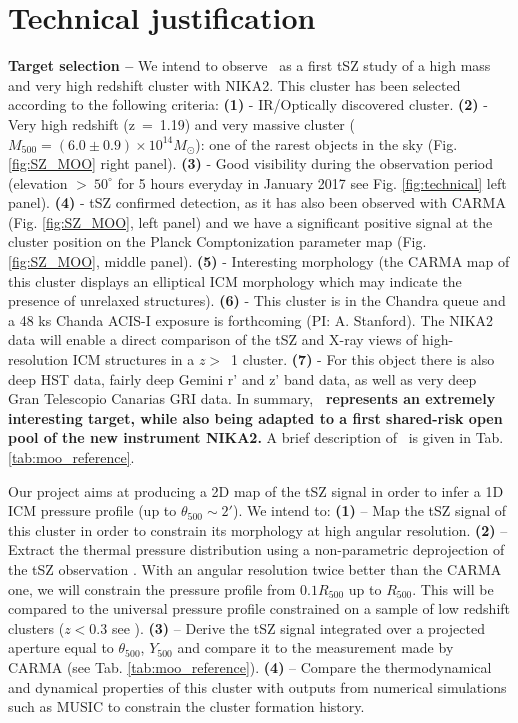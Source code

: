 \documentclass[11pt,a4paper,twoside,graphicx,color]{article}
\begin{document}
\section{Technical justification}
{\bf \large Target selection -- }
We intend to observe \moo\ as a first tSZ study of a high mass and very high redshift cluster with NIKA2. This cluster has been selected according to the following criteria: \textbf{(1)} - IR/Optically discovered cluster. \textbf{(2)} - Very high redshift (z~=~1.19) and very massive cluster ($M_{500} = (6.0 \pm 0.9) \times 10^{14} M_{\odot}$): one of the rarest objects in the sky (Fig. \ref{fig:SZ_MOO} right panel). \textbf{(3)} - Good visibility during the observation period (elevation $>~50^\circ$ for 5 hours everyday in January 2017 see Fig. \ref{fig:technical} left panel). \textbf{(4)} - tSZ confirmed detection, as it has also been observed with CARMA (Fig. \ref{fig:SZ_MOO}, left panel) and we have a significant positive signal at the cluster position on the Planck Comptonization parameter map (Fig. \ref{fig:SZ_MOO}, middle panel). \textbf{(5)} - Interesting morphology (the CARMA map of this cluster displays an elliptical ICM morphology which may indicate the presence of unrelaxed structures). \textbf{(6)} - This cluster is in the Chandra queue and a 48 ks Chanda ACIS-I exposure is forthcoming (PI: A. Stanford).  The NIKA2 data will enable a direct comparison of the tSZ and X-ray views of high-resolution ICM structures in a $z >$~1 cluster. \textbf{(7)} - For this object there is also deep HST data, fairly deep Gemini r' and z' band data, as well as very deep Gran Telescopio Canarias GRI data.
In summary, \textbf{\moo\ represents an extremely interesting target, while also being adapted to a first shared-risk open pool of the new instrument NIKA2.} A brief description of \moo\ is given in Tab. \ref{tab:moo_reference}.

Our project aims at producing a 2D map of the tSZ signal in order to infer a 1D ICM pressure profile (up to $\theta_{500} \sim 2'$). We intend to: \textbf{(1)} – Map the tSZ signal of this cluster in order to constrain its morphology at high angular resolution. \textbf{(2)} – Extract the thermal pressure distribution using a non-parametric deprojection of the tSZ observation \cite{rup16}. With an angular resolution twice better than the CARMA one, we will constrain the pressure profile from $0.1 R_{500}$ up to $R_{500}$. This will be compared to the universal pressure profile constrained on a sample of low redshift clusters ($z < 0.3$ see \cite{arn10}). \textbf{(3)} – Derive the tSZ signal integrated over a projected aperture equal to $\theta_{500}$, $Y_{500}$ and compare it to the measurement made by CARMA (see Tab. \ref{tab:moo_reference}). \textbf{(4)} – Compare the thermodynamical and dynamical properties of this cluster with outputs from numerical simulations such as MUSIC \cite{sem14} to constrain the cluster formation history.
\end{document}
